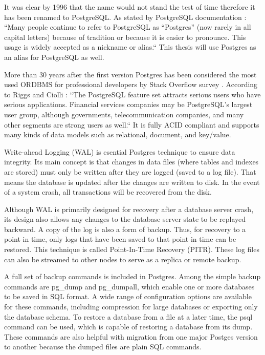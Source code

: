 It was clear by 1996 that the name would not stand the test of time therefore it has been renamed to PostgreSQL. As stated by PostgreSQL documentation \cite{docuPgBriefHistory}: “Many people continue to refer to PostgreSQL as “Postgres” (now rarely in all capital letters) because of tradition or because it is easier to pronounce. This usage is widely accepted as a nickname or alias.“ This thesis will use Postgres as an alias for PostgreSQL as well.

More than 30 years after the first version Postgres has been considered the most used ORDBMS for professional developers by Stack Overflow survey \cite{so2022survey}. According to Riggs and Ciolli \cite{pg14introduction}: “The PostgreSQL feature set attracts serious users who have serious applications. Financial services companies may be PostgreSQL's largest user group, although governments, telecommunication companies, and many other segments are strong users as well.“ It is fully ACID compliant \cite{juba2015learningTransactionIsolation} and supports many kinds of data models such as relational, document, and key/value. \cite{pg14introduction}



Write-ahead Logging (WAL) is esential Postgres technique to ensure data integrity. Its main concept is that changes in data files (where tables and indexes are stored) must only be written after they are logged (saved to a log file). That means the database is updated after the changes are written to disk. In the event of a system crash, all transactions will be recovered from the disk. \cite{docuPgWal}

Although WAL is primarily designed for recovery after a database server crash, its design also allows any changes to the database server state to be replayed backward. A copy of the log is also a form of backup. Thus, for recovery to a point in time, only logs that have been saved to that point in time can be restored. This technique is called Point-In-Time Recovery (PITR). \cite{DocuPgPITR} These log files can also be streamed to other nodes to serve as a replica or remote backup. \cite{pg14replication}

A full set of backup commands is included in Postgres. Among the simple backup commands are pg\_dump and pg\_dumpall, which enable one or more databases to be saved in SQL format. A wide range of configuration options are available for these commands, including compression for large databases or exporting only the database schema. To restore a database from a file at a later time, the psql command can be used, which is capable of restoring a database from its dump. \cite{DocuPgDump} These commands are also helpful with migration from one major Postges version to another because the dumped files are plain SQL commands.

